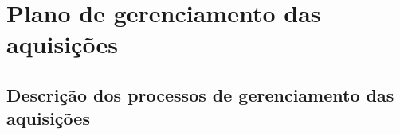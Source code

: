 
\chapter{Plano de gerenciamento das aquisições}
\label{ch:procurement-management-plan}

\section{Descrição dos processos de gerenciamento das aquisições}

